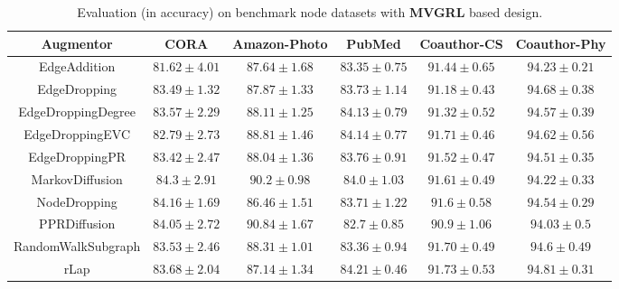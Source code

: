 \documentclass{article}
\theoremstyle{plain}
\theoremstyle{definition}
\theoremstyle{remark}
\begin{document}
\begin{table*}[ht!]
\centering
\caption{Evaluation (in accuracy) on benchmark node datasets with \textbf{MVGRL} based design.}
\label{table:results_mvgrl}
\vskip 0.15in
\begin{center}
\begin{small}
\begin{sc}
\begin{tabular}{c|c|c|c|c|c}
\toprule
Augmentor & CORA & Amazon-Photo & PubMed & Coauthor-CS & Coauthor-Phy \\
\midrule
EdgeAddition & $81.62 \pm 4.01$  & $87.64 \pm 1.68$ & $83.35 \pm 0.75$  & $91.44 \pm 0.65$ & $94.23 \pm 0.21$ \\
EdgeDropping &  $83.49 \pm 1.32$ & $87.87 \pm 1.33$ & $83.73 \pm 1.14$  &   $91.18 \pm 0.43$ & \underline{$94.68 \pm 0.38$}\\
EdgeDroppingDegree & $83.57 \pm 2.29$  & $88.11 \pm 1.25$ & $84.13 \pm 0.79$ & $91.32 \pm 0.52$ & $94.57 \pm 0.39$\\
EdgeDroppingEVC & $82.79 \pm 2.73$  & $88.81 \pm 1.46$ & \underline{$84.14 \pm 0.77$} & \underline{$91.71 \pm 0.46$} & $94.62 \pm 0.56$ \\
EdgeDroppingPR & $83.42 \pm 2.47$ & $88.04 \pm 1.36$  & $83.76 \pm 0.91$ & $91.52 \pm 0.47$ & $94.51 \pm 0.35$\\
MarkovDiffusion & $\mathbf{84.3 \pm 2.91}$  & \underline{$90.2 \pm 0.98$} & $84.0 \pm 1.03$ & $91.61 \pm 0.49$ & $94.22 \pm 0.33$ \\
NodeDropping & \underline{$84.16 \pm 1.69$} & $86.46 \pm 1.51$ & $83.71 \pm 1.22$ & $91.6 \pm 0.58$ & $94.54 \pm 0.29$  \\
PPRDiffusion & $84.05 \pm 2.72$  & $\mathbf{90.84 \pm 1.67}$  & $82.7 \pm 0.85$ & $90.9 \pm 1.06$ & $94.03 \pm 0.5$ \\
RandomWalkSubgraph & $83.53 \pm 2.46$  & $88.31 \pm 1.01$ & $83.36 \pm 0.94$ & $91.70 \pm 0.49$ & $94.6 \pm 0.49$\\
rLap & $83.68 \pm 2.04$ & $87.14 \pm 1.34$ &  $\mathbf{84.21 \pm 0.46}$ & $\mathbf{91.73 \pm 0.53}$ & $\mathbf{94.81 \pm 0.31}$ \\
\bottomrule
\end{tabular}
\end{sc}
\end{small}
\end{center}
\vskip -0.1in
\end{table*}
\end{document}
